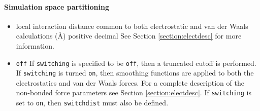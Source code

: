 \paragraph{Simulation space partitioning}

\begin{itemize}


\item
{}%
{local interaction distance common to both electrostatic 
and van der Waals calculations (\AA)}%
{positive decimal}%
{%
See Section \ref{section:electdesc} for more information.}

\item
{}
{\verb!off!}
{If \verb!switching! is
specified to be \verb!off!, then a truncated cutoff is performed.
If \verb!switching! is turned \verb!on!, then smoothing functions
are applied to both the electrostatics and van der Waals forces.
For a complete description of the non-bonded force parameters see
Section \ref{section:electdesc}.  If \verb!switching! is set to
\verb!on!, then \verb!switchdist! must also be defined.}


\end{itemize}
